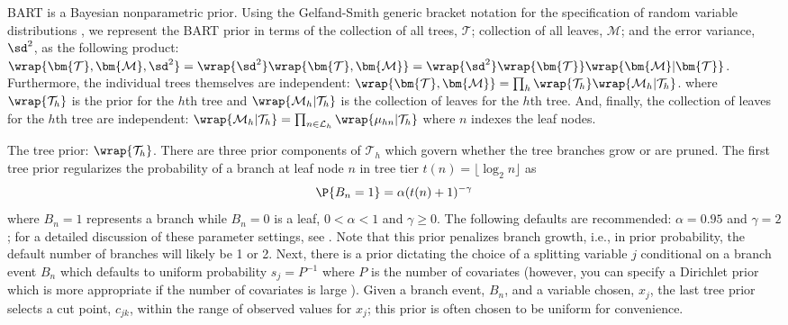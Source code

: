 \documentclass[cmbright,doublespace]{WileySTAT-V1}
\theoremstyle{plain}
\begin{document}
BART is a Bayesian nonparametric prior.  Using the Gelfand-Smith
generic bracket notation for the specification of random variable
distributions \citep{GelfSmit90}, we represent the BART prior in terms
of the collection of all trees, $\bm{\mathcal{T}}$; collection of all
leaves, $\bm{\mathcal{M}}$; and the error variance, $\sd^2$, as the
following product:
$\wrap{\bm{\mathcal{T}}, \bm{\mathcal{M}}, \sd^2}=
\wrap{\sd^2}\wrap{\bm{\mathcal{T}}, \bm{\mathcal{M}}}=
\wrap{\sd^2}\wrap{\bm{\mathcal{T}}}\wrap{\bm{\mathcal{M}}|\bm{\mathcal{T}}}$.
Furthermore, the individual trees themselves are independent:
$\wrap{\bm{\mathcal{T}}, \bm{\mathcal{M}}}=\prod_h
\wrap{\mathcal{T}_h}\wrap{\mathcal{M}_h|\mathcal{T}_h}$.  where
$\wrap{\mathcal{T}_h}$ is the prior for the $h$th tree and
$\wrap{\mathcal{M}_h|\mathcal{T}_h}$ is the collection of leaves for
the $h$th tree.  And, finally, the collection of leaves for the $h$th
tree are independent:
$\wrap{\mathcal{M}_h|\mathcal{T}_h}=
\prod_{n\in\mathcal{L}_h}\wrap{\mu_{hn}|\mathcal{T}_h}$ where $n$ indexes the leaf
nodes.

The tree prior: $\wrap{\mathcal{T}_h}$.  There are three prior
components of $\mathcal{T}_h$ which govern whether the tree branches
grow or are pruned.
The first tree prior regularizes the probability of a branch at leaf
node $n$ in tree tier $t(n)=\lfloor\log_2 n\rfloor$ as
\begin{align}\label{regularity}
\P{B_n=1}=\alpha (t(n)+1)^{-\gamma}
\end{align}
where $B_n=1$ represents a branch while $B_n=0$ is a leaf,
$0<\alpha<1$ and $\gamma\ge 0$.  The following defaults are
recommended: $\alpha=0.95$ and $\gamma=2$; for a detailed discussion
of these parameter settings, see \citet{ChipGeor98}.  Note that this
prior penalizes branch growth, i.e., in prior probability, the default
number of branches will likely be 1 or 2.  Next, there is a prior
dictating the choice of a splitting variable $j$ conditional on a
branch event $B_n$ which defaults to uniform probability $s_j=P^{-1}$
where $P$ is the number of covariates (however, you can specify a
Dirichlet prior which is more appropriate if the number of covariates
is large \citep{Line16}).  Given a branch event, $B_n$, and
a variable chosen, $x_j$, the last tree prior selects a cut point,
$c_{jk}$, within the range of observed values for $x_j$; this prior is
often chosen to be uniform for convenience.
\end{document}
